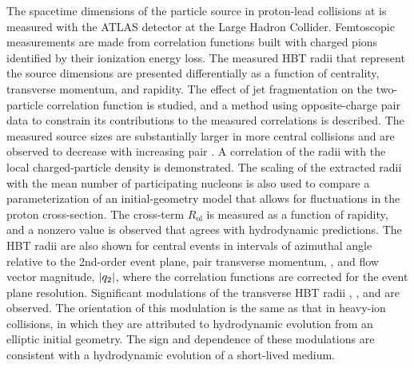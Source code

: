 The spacetime dimensions of the particle source in proton-lead collisions at \pPbenergy is measured with the ATLAS detector at the Large Hadron Collider.
Femtoscopic measurements are made from correlation functions built with charged pions identified by their ionization energy loss.
The measured HBT radii that represent the source dimensions are presented differentially as a function of centrality, transverse momentum, and rapidity.
The effect of jet fragmentation on the two-particle correlation function is studied, and a method using opposite-charge pair data to constrain its contributions to the measured correlations is described.
The measured source sizes are substantially larger in more central collisions and are observed to decrease with increasing pair \kt.
A correlation of the radii with the local charged-particle density \dNdy is demonstrated.
The scaling of the extracted radii with the mean number of participating nucleons is also used to compare a parameterization of an initial-geometry model that allows for fluctuations in the proton cross-section.
The cross-term $R_\mathrm{ol}$ is measured as a function of rapidity, and a nonzero value is observed that agrees with hydrodynamic predictions.
The HBT radii are also shown for central events in intervals of azimuthal angle relative to the 2nd-order event plane, pair transverse momentum, \kt, and flow vector magnitude, $|q_{2}|$, where the correlation functions are corrected for the event plane resolution.
Significant modulations of the transverse HBT radii \Rout, \Rside, and \Ros are observed.
The orientation of this modulation is the same as that in heavy-ion collisions, in which they are attributed to hydrodynamic evolution from an elliptic initial geometry.
The sign and \kt dependence of these modulations are consistent with a hydrodynamic evolution of a short-lived medium.
